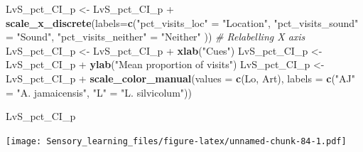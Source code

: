 \documentclass[]{article}
\newenvironment{Shaded}{\begin{snugshade}}{\end{snugshade}}
\newcommand{\KeywordTok}[1]{\textcolor[rgb]{0.13,0.29,0.53}{\textbf{{#1}}}}
\newcommand{\DataTypeTok}[1]{\textcolor[rgb]{0.13,0.29,0.53}{{#1}}}
\newcommand{\StringTok}[1]{\textcolor[rgb]{0.31,0.60,0.02}{{#1}}}
\newcommand{\CommentTok}[1]{\textcolor[rgb]{0.56,0.35,0.01}{\textit{{#1}}}}
\newcommand{\NormalTok}[1]{{#1}}
\begin{document}
\begin{Shaded}
\begin{Highlighting}[]
\NormalTok{LvS_pct_CI_p <-}\StringTok{ }\NormalTok{LvS_pct_CI_p +}\StringTok{ }\KeywordTok{scale_x_discrete}\NormalTok{(}\DataTypeTok{labels=}\KeywordTok{c}\NormalTok{(}\StringTok{"pct_visits_loc"} \NormalTok{=}\StringTok{ "Location"}\NormalTok{, }\StringTok{"pct_visits_sound"} \NormalTok{=}\StringTok{ "Sound"}\NormalTok{,}
                              \StringTok{"pct_visits_neither"} \NormalTok{=}\StringTok{ "Neither"} \NormalTok{))  }\CommentTok{# Relabelling X axis}
\NormalTok{LvS_pct_CI_p <-}\StringTok{ }\NormalTok{LvS_pct_CI_p +}\StringTok{ }\KeywordTok{xlab}\NormalTok{(}\StringTok{"Cues"}\NormalTok{)}
\NormalTok{LvS_pct_CI_p <-}\StringTok{ }\NormalTok{LvS_pct_CI_p +}\StringTok{ }\KeywordTok{ylab}\NormalTok{(}\StringTok{"Mean proportion of visits"}\NormalTok{)}
\NormalTok{LvS_pct_CI_p <-}\StringTok{ }\NormalTok{LvS_pct_CI_p +}\StringTok{ }\KeywordTok{scale_color_manual}\NormalTok{(}\DataTypeTok{values =} \KeywordTok{c}\NormalTok{(Lo, Art), }\DataTypeTok{labels =} \KeywordTok{c}\NormalTok{(}\StringTok{"AJ"} \NormalTok{=}\StringTok{ "A. jamaicensis"}\NormalTok{, }\StringTok{"L"} \NormalTok{=}\StringTok{ "L. silvicolum"}\NormalTok{))}


\NormalTok{LvS_pct_CI_p                    }
\end{Highlighting}
\end{Shaded}

\texttt{[image: Sensory\_learning\_files/figure-latex/unnamed-chunk-84-1.pdf]}
\end{document}
